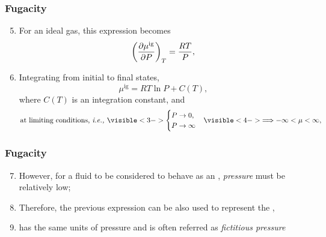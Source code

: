 \documentclass[10pt,compress,unknownkeysallowed]{beamer}
\begin{document}
\begin{frame}
  \frametitle{Fugacity}
        \begin{enumerate}\setcounter{enumi}{4}  
           \item<1-> For an ideal gas, this expression becomes
              \begin{displaymath}
                 \Partial[\mu^{\text{ig}}]{P}{T} = \frc{RT}{P}, 
              \end{displaymath}
              
           \item<2-> Integrating from initial to final states,
              \begin{displaymath}
                \mu^{\text{ig}} = RT\ln{P} + C(T), 
              \end{displaymath}
              where $C(T)$ is an integration constant, and
              \begin{displaymath}
                \text{at limiting conditions, \ie }
                \visible<3->{\begin{cases}
                  P\rightarrow 0, & \\
                  P\rightarrow \infty &
                \end{cases}}
                \visible<4->{\Longrightarrow -\infty < \mu < \infty,}
              \end{displaymath}               
        \end{enumerate}
\end{frame}
\normalsize



\begin{frame}
  \frametitle{Fugacity}
        \begin{enumerate}\setcounter{enumi}{6}  
           \item<1-> However, for a fluid to be considered to behave as an , {\it pressure} must be relatively low;
           \item<2-> Therefore, the previous expression can be also used to represent the ,
           
           \item<3->  has the same units of pressure and is often referred as {\it fictitious pressure} 
               
        \end{enumerate}
\end{frame}
\normalsize
\end{document}
